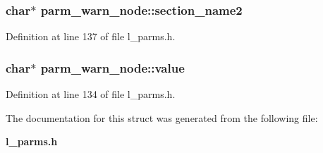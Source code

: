 \subsubsection{\setlength{\rightskip}{0pt plus 5cm}char$\ast$ \bf{parm\_\-warn\_\-node::section\_\-name2}}\label{structparm__warn__node_47ed74c614aa2055e63918a6f3838e71}




Definition at line 137 of file l\_\-parms.h.
\subsubsection{\setlength{\rightskip}{0pt plus 5cm}char$\ast$ \bf{parm\_\-warn\_\-node::value}}\label{structparm__warn__node_3756e66014816c082e016ef9a4a22275}




Definition at line 134 of file l\_\-parms.h.

The documentation for this struct was generated from the following file:\begin{CompactItemize}
\item 
\bf{l\_\-parms.h}\end{CompactItemize}
